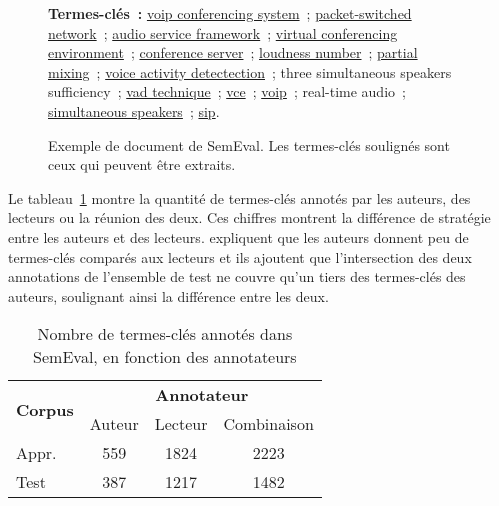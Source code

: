 \begin{figure}[!h]
{{          \textbf{Termes-clés~:} \underline{voip conferencing system}~;
          \underline{packet-switched network}~; \underline{audio service
          framework}~; \underline{virtual conferencing environment}~;
          \underline{conference server}~; \underline{loudness number}~;
          \underline{partial mixing}~; \underline{voice activity detectection}~;
          three simultaneous speakers sufficiency~; \underline{vad technique}~;
          \underline{vce}~; \underline{voip}~; real-time audio~;
          \underline{simultaneous speakers}~; \underline{sip}.
        }
      }
      \caption[Exemple de document de SemEval]{
        Exemple de document de SemEval. Les termes-clés soulignés sont ceux qui
        peuvent être extraits.
        \label{fig:example_semeval}
      }
    \end{figure}

    Le tableau~\ref{tab:semeval_annotators} montre la quantité de termes-clés
    annotés par les auteurs, des lecteurs ou la réunion des deux. Ces chiffres
    montrent la différence de stratégie entre les auteurs et des lecteurs.
     expliquent que les auteurs donnent peu de
    termes-clés comparés aux lecteurs et ils ajoutent que l'intersection des
    deux annotations de l'ensemble de test ne couvre qu'un tiers des termes-clés
    des auteurs, soulignant ainsi la différence entre les deux.

    \begin{table}[!h]
      \centering
      \begin{tabular}{l|ccc}
        \toprule
        \multirow{2}{*}{\textbf{Corpus}} & \multicolumn{3}{c}{\textbf{Annotateur}}\\
        \cline{2-4}
        & Auteur & Lecteur & Combinaison\\
        \hline
        \hfill{}Appr. & 559 & 1824 & 2223\\
        \hfill{}Test & 387 & 1217 & 1482\\
        \bottomrule
      \end{tabular}

      \caption{Nombre de termes-clés annotés dans SemEval, en fonction des
               annotateurs
               \label{tab:semeval_annotators}}
    \end{table}


